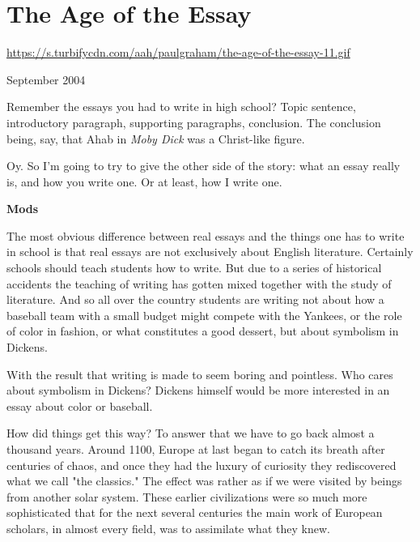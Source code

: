 \chapter{The Age of the Essay}


            
              
                \href{https://s.turbifycdn.com/aah/paulgraham/the-age-of-the-essay-11.gif}{https://s.turbifycdn.com/aah/paulgraham/the-age-of-the-essay-11.gif}



September 2004

Remember the essays you had to
                  write in high school? Topic sentence, introductory paragraph,
                  supporting paragraphs, conclusion. The conclusion being, say,
                  that Ahab in \emph{Moby Dick} was a Christ-like figure.

Oy.
                  So I'm going to try to give the other side of the story: what
                  an essay really is, and how you write one. Or at least, how I
                  write one.

\textbf{Mods}

The most obvious
                  difference between real essays and the things one has to write
                  in school is that real essays are not exclusively about
                  English literature. Certainly schools should teach students
                  how to write. But due to a series of historical accidents the
                  teaching of writing has gotten mixed together with the study
                  of literature. And so all over the country students are
                  writing not about how a baseball team with a small budget
                  might compete with the Yankees, or the role of color in
                  fashion, or what constitutes a good dessert, but about
                  symbolism in Dickens.

With the result that writing
                  is made to seem boring and pointless. Who cares about
                  symbolism in Dickens? Dickens himself would be more interested
                  in an essay about color or baseball.

How did things
                  get this way? To answer that we have to go back almost a
                  thousand years. Around 1100, Europe at last began to catch its
                  breath after centuries of chaos, and once they had the luxury
                  of curiosity they rediscovered what we call "the classics."
                  The effect was rather as if we were visited by beings from
                  another solar system. These earlier civilizations were so much
                  more sophisticated that for the next several centuries the
                  main work of European scholars, in almost every field, was to
                  assimilate what they knew.

